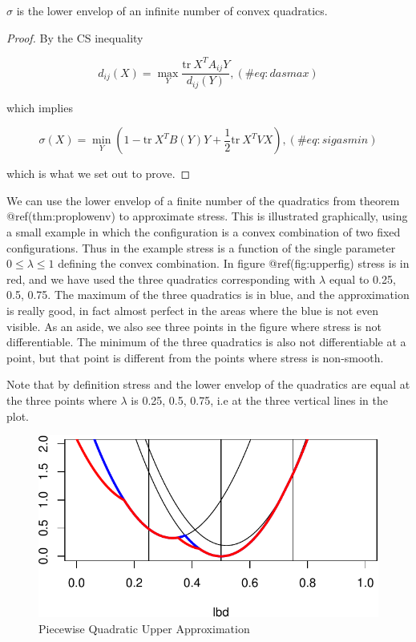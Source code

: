 \documentclass[
  12pt,
  letterpaper,
  DIV=11,
  numbers=noendperiod]{scrreprt}
\theoremstyle{remark}
\begin{document}
\label{proplowenv}
\(\sigma\) is the lower envelop of an infinite number of convex
quadratics.

\begin{proof}
By the CS inequality

\begin{equation}
d_{ij}(X)=\max_Y \frac{\text{tr}\ X^TA_{ij}Y}{d_{ij}(Y)},
(\#eq:dasmax)
\end{equation}

which implies

\begin{equation}
\sigma(X)=\min_Y\left(1-\text{tr}\ X^TB(Y)Y+\frac12\text{tr}\ X^TVX\right),
(\#eq:sigasmin)
\end{equation}

which is what we set out to prove.
\end{proof}

We can use the lower envelop of a finite number of the quadratics from
theorem @ref(thm:proplowenv) to approximate stress. This is illustrated
graphically, using a small example in which the configuration is a
convex combination of two fixed configurations. Thus in the example
stress is a function of the single parameter \(0\leq\lambda\leq 1\)
defining the convex combination. In figure @ref(fig:upperfig) stress is
in red, and we have used the three quadratics corresponding with
\(\lambda\) equal to 0.25, 0.5, 0.75. The maximum of the three
quadratics is in blue, and the approximation is really good, in fact
almost perfect in the areas where the blue is not even visible. As an
aside, we also see three points in the figure where stress is not
differentiable. The minimum of the three quadratics is also not
differentiable at a point, but that point is different from the points
where stress is non-smooth.

Note that by definition stress and the lower envelop of the quadratics
are equal at the three points where \(\lambda\) is 0.25, 0.5, 0.75, i.e
at the three vertical lines in the plot.

\begin{figure}[H]

{\centering \includegraphics{minimization_files/figure-pdf/upperfig-1.pdf}

}

\caption{Piecewise Quadratic Upper Approximation}

\end{figure}%
\end{document}

